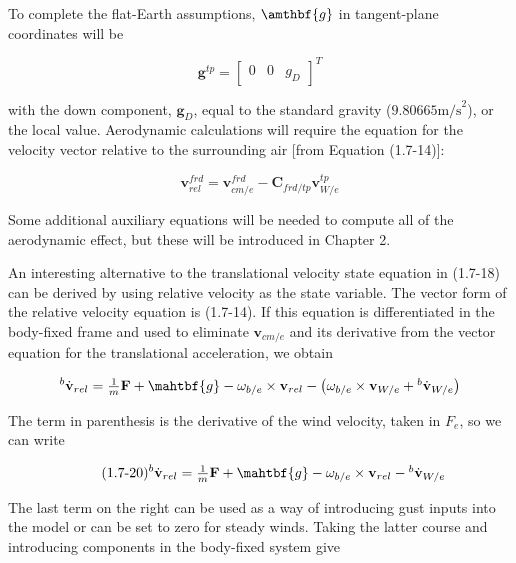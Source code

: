 To complete the flat-Earth assumptions, \(\amthbf{g}\) in tangent-plane coordinates will be

\begin{equation*}
\mathbf{g}^{tp} = {\begin{bmatrix} 0 & 0& g_{D} \end{bmatrix}}^{T}
\end{equation*}

with the down component, \(\mathbf{g}_{D}\), equal to the standard gravity (\(9.80665 \textrm{m/s}^{2}\)), or the local value. Aerodynamic calculations will require the equation for the velocity vector relative to the surrounding air [from Equation (1.7-14)]:

\begin{equation*}\tag{1.7-19}
    \mathbf{v}^{frd}_{rel} =  \mathbf{v}^{frd}_{cm/e} - \mathbf{C}_{frd/tp} \mathbf{v}^{tp}_{W/e}
\end{equation*}

Some additional auxiliary equations will be needed to compute all of the aerodynamic effect, but these will be introduced in Chapter 2.

An interesting alternative to the translational velocity state equation in (1.7-18) can be derived by using relative velocity as the state variable. The vector form of the relative velocity equation is (1.7-14). If this equation is differentiated in the body-fixed frame and used to eliminate \(\mathbf{v}_{cm/e}\) and its derivative from the vector equation for the translational acceleration, we obtain

\begin{equation*}
    {^{b}{\dot{\mathbf{v}}_{rel}}} = \textstyle{\frac{1}{m}} \mathbf{F} + \mahtbf{g} - \mathbf{\omega}_{b/e} \times \mathbf{v}_{rel} - \left( {\mathbf{\omega}_{b/e}} \times {\mathbf{v}_{W/e}} + {^{b}{\dot{\mathbf{v}}_{W/e}}} \right)
\end{equation*}

The term in parenthesis is the derivative of the wind velocity, taken in \(F_{e}\), so we can write

\begin{equation*}\tag{1.7-20}
    {^{b}{\dot{\mathbf{v}}_{rel}}} = \textstyle{\frac{1}{m}} \mathbf{F} + \mahtbf{g} - \mathbf{\omega}_{b/e} \times \mathbf{v}_{rel} - {^{b}{\dot{\mathbf{v}}_{W/e}}}
\end{equation*}

The last term on the right can be used as a way of introducing gust inputs into the model or can be set to zero for steady winds. Taking the latter course and introducing components in the body-fixed system give

